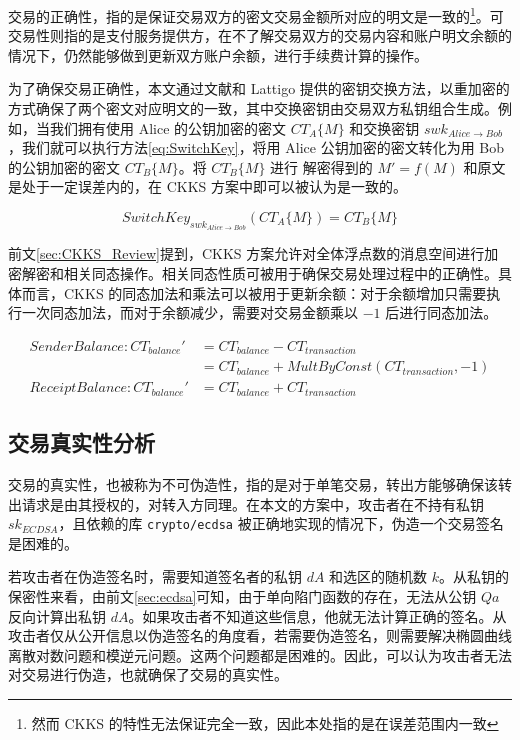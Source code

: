 交易的正确性，指的是保证交易双方的密文交易金额所对应的明文是一致的\footnote{然而 CKKS 的特性无法保证完全一致，因此本处指的是在误差范围内一致}。可交易性则指的是支付服务提供方，在不了解交易双方的交易内容和账户明文余额的情况下，仍然能够做到更新双方账户余额，进行手续费计算的操作。

为了确保交易正确性，本文通过文献\cite{brakerski2014leveled}和 Lattigo 提供的密钥交换方法，以重加密的方式确保了两个密文对应明文的一致，其中交换密钥由交易双方私钥组合生成。例如，当我们拥有使用 Alice 的公钥加密的密文 $CT_{A}\{M\}$ 和交换密钥 $swk_{Alice \rightarrow Bob}$，我们就可以执行方法\eqref{eq:SwitchKey}，将用 Alice 公钥加密的密文转化为用 Bob 的公钥加密的密文 $CT_{B}\{M\}$。将 $CT_{B}\{M\}$ 进行 解密得到的 $M' = f(M)$ 和原文是处于一定误差内的，在 CKKS 方案中即可以被认为是一致的。

\begin{equation} \label{eq:SwitchKey}
    SwitchKey_{swk_{Alice \rightarrow Bob}}(CT_{A}\{M\}) = CT_{B}\{M\}
\end{equation}

前文\ref{sec:CKKS_Review}提到，CKKS 方案允许对全体浮点数的消息空间进行加密解密和相关同态操作。相关同态性质可被用于确保交易处理过程中的正确性。具体而言，CKKS 的同态加法和乘法可以被用于更新余额：对于余额增加只需要执行一次同态加法，而对于余额减少，需要对交易金额乘以 $-1$ 后进行同态加法。

\begin{equation}
\begin{aligned}
    Sender Balance:  CT_{balance}' & = CT_{balance} - CT_{transaction}\\
    &= CT_{balance} + MultByConst(CT_{transaction}, -1)\\
    Receipt Balance: CT_{balance}' & = CT_{balance} + CT_{transaction}
\end{aligned}
\end{equation}

\subsection{交易真实性分析}

交易的真实性，也被称为不可伪造性，指的是对于单笔交易，转出方能够确保该转出请求是由其授权的，对转入方同理。在本文的方案中，攻击者在不持有私钥 $sk_{ECDSA}$，且依赖的库 \verb|crypto/ecdsa| 被正确地实现的情况下，伪造一个交易签名是困难的。

若攻击者在伪造签名时，需要知道签名者的私钥 $dA$ 和选区的随机数 $k$。从私钥的保密性来看，由前文\ref{sec:ecdsa}可知，由于单向陷门函数的存在，无法从公钥 $Qa$ 反向计算出私钥 $dA$。如果攻击者不知道这些信息，他就无法计算正确的签名。从攻击者仅从公开信息以伪造签名的角度看，若需要伪造签名，则需要解决椭圆曲线离散对数问题\cite{Hankerson2011}和模逆元问题。这两个问题都是困难的。因此，可以认为攻击者无法对交易进行伪造，也就确保了交易的真实性。
